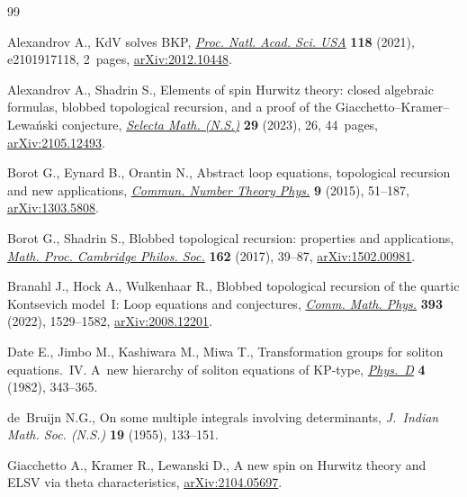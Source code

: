 \documentclass[pdftex]{sigma}
\numberwithin{equation}{section}
\begin{document}
\begin{thebibliography}{99}
\footnotesize\itemsep=0pt

Alexandrov A., Kd{V} solves {BKP}, \href{https://doi.org/10.1073/pnas.2101917118}{\textit{Proc. Natl. Acad. Sci. USA}}
 \textbf{118} (2021), e2101917118, 2~pages, \href{https://arxiv.org/abs/2012.10448}{arXiv:2012.10448}.

Alexandrov A., Shadrin S., Elements of spin {H}urwitz theory: closed algebraic
 formulas, blobbed topological recursion, and a proof of the
 {G}iacchetto--{K}ramer--{L}ewa\'nski conjecture, \href{https://doi.org/10.1007/s00029-023-00834-1}{\textit{Selecta Math.
 (N.S.)}} \textbf{29} (2023), 26, 44~pages, \href{https://arxiv.org/abs/2105.12493}{arXiv:2105.12493}.

Borot G., Eynard B., Orantin N., Abstract loop equations, topological recursion
 and new applications, \href{https://doi.org/10.4310/CNTP.2015.v9.n1.a2}{\textit{Commun. Number Theory Phys.}} \textbf{9} (2015),
 51--187, \href{https://arxiv.org/abs/1303.5808}{arXiv:1303.5808}.

Borot G., Shadrin S., Blobbed topological recursion: properties and
 applications, \href{https://doi.org/10.1017/S0305004116000323}{\textit{Math. Proc. Cambridge Philos. Soc.}} \textbf{162}
 (2017), 39--87, \href{https://arxiv.org/abs/1502.00981}{arXiv:1502.00981}.

Branahl J., Hock A., Wulkenhaar R., Blobbed topological recursion of the
 quartic {K}ontsevich model~{I}: {L}oop equations and conjectures,
 \href{https://doi.org/10.1007/s00220-022-04392-z}{\textit{Comm. Math. Phys.}} \textbf{393} (2022), 1529--1582,
 \href{https://arxiv.org/abs/2008.12201}{arXiv:2008.12201}.

Date E., Jimbo M., Kashiwara M., Miwa T., Transformation groups for soliton
 equations.~{IV}. {A}~new hierarchy of soliton equations of {KP}-type,
 \href{https://doi.org/10.1016/0167-2789(82)90041-0}{\textit{Phys.~D}} \textbf{4} (1982), 343--365.

de~Bruijn N.G., On some multiple integrals involving determinants,
 \textit{J.~Indian Math. Soc. (N.S.)} \textbf{19} (1955), 133--151.

Giacchetto A., Kramer R., Lewanski D., A new spin on {H}urwitz theory and
 {ELSV} via theta characteristics, \href{https://arxiv.org/abs/2104.05697}{arXiv:2104.05697}.


\end{thebibliography}
\end{document}
